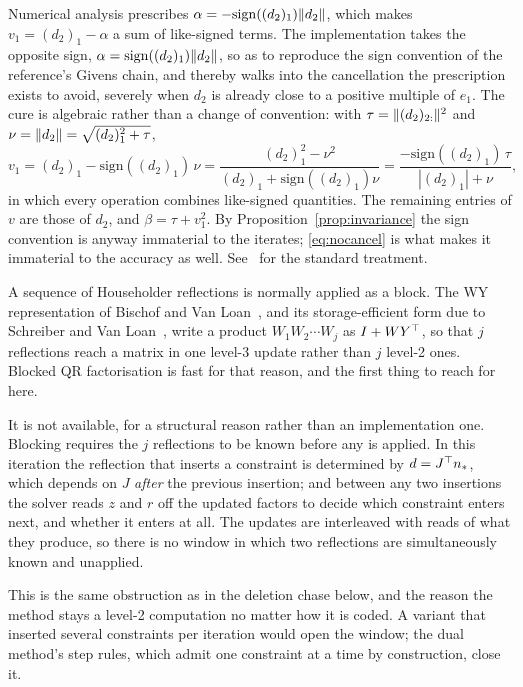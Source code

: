 \begin{remark}\label{rem:sign}
Numerical analysis prescribes $\alpha = -\mathrm{sign}((d_2)_1)\lVert d_2 \rVert$, which
makes $v_1 = (d_2)_1 - \alpha$ a sum of like-signed terms. The implementation
takes the opposite sign, $\alpha = \mathrm{sign}((d_2)_1)\lVert d_2 \rVert$, so as to
reproduce the sign convention of the reference's Givens chain, and thereby walks
into the cancellation the prescription exists to avoid, severely when $d_2$ is
already close to a positive multiple of $e_1$. The cure is algebraic rather than a
change of convention: with $\tau = \lVert (d_2)_{2:} \rVert^2$ and
$\nu = \lVert d_2 \rVert = \sqrt{(d_2)_1^2 + \tau}$,
\begin{equation}
  v_1 = (d_2)_1 - \mathrm{sign}((d_2)_1)\,\nu
      = \frac{(d_2)_1^2 - \nu^2}{(d_2)_1 + \mathrm{sign}((d_2)_1)\nu}
      = \frac{-\mathrm{sign}((d_2)_1)\,\tau}{|(d_2)_1| + \nu},
  \label{eq:nocancel}
\end{equation}
in which every operation combines like-signed quantities. The remaining entries
of $v$ are those of $d_2$, and $\beta = \tau + v_1^2$. By
Proposition~\ref{prop:invariance} the sign convention is anyway immaterial to the
iterates; \eqref{eq:nocancel} is what makes it immaterial to the accuracy as
well. See~\cite{golub2013,higham2002} for the standard treatment.
\end{remark}

\begin{remark}\label{rem:wy}
A sequence of Householder reflections is normally applied as a block. The WY
representation of Bischof and Van Loan~\cite{bischof1987}, and its storage-efficient
form due to Schreiber and Van Loan~\cite{schreiber1989}, write a product
$W_1 W_2 \cdots W_j$ as $I + WY^{\top}$, so that $j$ reflections reach a matrix in one
level-3 update rather than $j$ level-2 ones. Blocked QR factorisation is fast for
that reason, and the first thing to reach for here.

It is not available, for a structural reason rather than an implementation one.
Blocking requires the $j$ reflections to be known before any is applied. In this
iteration the reflection that inserts a constraint is determined by
$d = J^{\top} n_*$, which depends on $J$ \emph{after} the previous insertion; and
between any two insertions the solver reads $z$ and $r$ off the updated factors to
decide which constraint enters next, and whether it enters at all. The updates are
interleaved with reads of what they produce, so there is no window in which two
reflections are simultaneously known and unapplied.

This is the same obstruction as in the deletion chase below, and the reason the
method stays a level-2 computation no matter how it is coded. A variant
that inserted several constraints per iteration would open the window; the dual
method's step rules, which admit one constraint at a time by construction, close
it.
\end{remark}

